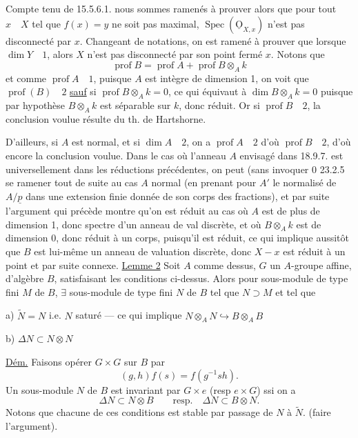 Compte tenu de 15.5.6.1. nous sommes ramenés à prouver alors que pour tout $x\quad X$ tel que $f(x)=y$ ne soit pas maximal, $\operatorname{Spec}(\underline{\mathrm O}_{X,x})$ n'est pas disconnecté par $x$. Changeant de notations, on est ramené à prouver que lorsque $\dim Y\quad1$, alors $X$ n'est pas disconnecté par son point fermé $x$. Notons que
\[
\operatorname{prof}B=\operatorname{prof}A+\operatorname{prof}B\otimes_A k
\]
et comme $\operatorname{prof}A\quad1$, puisque $A$ est intègre de dimension 1, on voit que $\operatorname{prof}(B)\quad2$ \uline{sauf} si $\operatorname{prof}B\otimes_A k=0$, ce qui équivaut à $\dim B\otimes_A k=0$ puisque par hypothèse $B\otimes_A k$ est séparable sur $k$, donc  réduit. Or si $\operatorname{prof}B\quad2$, la conclusion voulue résulte du th. de Hartshorne. 

D'ailleurs, si $A$ est normal,  et si $\dim A\quad2$, on a $\operatorname{prof}A\quad2$ d'où $\operatorname{prof}B\quad2$, d'où encore la conclusion voulue. Dans le cas où l'anneau $A$ envisagé dans 18.9.7. est universellement    dans les réductions précédentes, on peut (sans invoquer 0 23.2.5\unsure{)} se ramener  tout de suite au cas $A$ normal (en prenant pour $A'$ le normalisé de $A/\underline p$ dans une extension finie donnée de son corps des fractions), et par suite  l'argument qui précède montre qu'on est réduit au cas où $A$ est de plus de dimension 1, donc spectre d'un anneau de val discrète, et où $B\otimes_A k$ est de dimension 0, donc réduit à un corps, puisqu'il est réduit, ce qui implique aussitôt que $B$ est lui-même un anneau de valuation discrète, donc $X-x$ est réduit à un point et par suite connexe.
\uline{Lemme 2} Soit  $A$ comme dessus, $G$ un $A$-groupe affine, d'algèbre $B$, satisfaisant les conditions ci-dessus. Alors pour  sous-module de type fini $M$ de $B$, $\exists$ sous-module de type fini $N$ de $B$ tel que $N\supset M$ et tel que

a) $\tilde N=N$ i.e. $N$ saturé --- ce qui implique $N\otimes_A N\hookrightarrow B\otimes_A B$

b) $\Delta N\subset N\otimes N$

\uline{Dém.} Faisons opérer $G\times G$ \deleted{$\unsure{\longrightarrow}$} sur $B$ par
\[
(g,h)f(s)=f(g^{-1}sh).
\]
 Un sous-module $N$ de $B$ est invariant par $G\times e$ (resp $e\times G$)  ssi on a
\[
\Delta N\subset N\otimes B\qquad\text{resp.}\quad\Delta N\subset B\otimes N.
\]
Notons que  chacune de ces conditions est stable par passage de $N$ à $\tilde N$. (faire l'argument).

